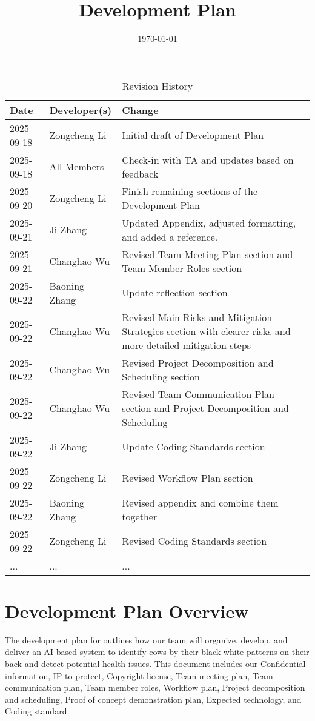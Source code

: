 \documentclass{article}
\title{Development Plan\\\progname}
\author{\authname}
\date{\today}
\begin{document}
\maketitle

\begin{table}[hp]
\caption{Revision History} \label{TblRevisionHistory}
\begin{tabularx}{\textwidth}{llX}
\toprule
\textbf{Date} & \textbf{Developer(s)} & \textbf{Change}\\
\midrule
2025-09-18 & Zongcheng Li   & Initial draft of Development Plan \\
2025-09-18 & All Members    & Check-in with TA and updates based on feedback \\
2025-09-20 & Zongcheng Li   & Finish remaining sections of the Development Plan \\
2025-09-21 & Ji Zhang       & Updated Appendix, adjusted formatting, and added a reference.\\
2025-09-21 & Changhao Wu    & Revised Team Meeting Plan section and Team Member Roles section \\
2025-09-22 & Baoning Zhang    & Update reflection section \\
2025-09-22 & Changhao Wu    & Revised Main Risks and Mitigation Strategies section with clearer risks and more detailed mitigation steps \\
2025-09-22 & Changhao Wu    & Revised Project Decomposition and Scheduling section \\
2025-09-22 & Changhao Wu    & Revised Team Communication Plan section and Project Decomposition and Scheduling\\
2025-09-22 & Ji Zhang       & Update Coding Standards section \\
2025-09-22 & Zongcheng Li    & Revised Workflow Plan section \\
2025-09-22 & Baoning Zhang   & Revised appendix and combine them together \\
2025-09-22 & Zongcheng Li    & Revised Coding Standards section \\
... & ... & ...\\

\bottomrule
\end{tabularx}
\end{table}

\newpage{}


\section*{Development Plan Overview}
The development plan for \progname{} outlines how our team will organize, develop, 
and deliver an AI-based system to identify cows by their black-white patterns on their back 
and detect potential health issues. This document includes our Confidential information, 
IP to protect, Copyright license, Team meeting plan, Team communication plan, Team member 
roles, Workflow plan, Project decomposition and scheduling, Proof of concept demonstration 
plan, Expected technology, and Coding standard.
\end{document}
